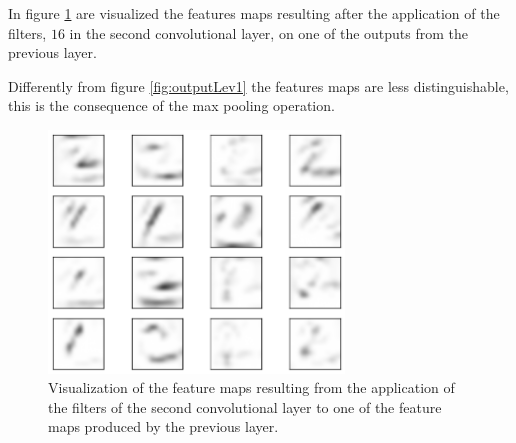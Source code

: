 In figure \ref{fig:outputLev2} are visualized the features maps resulting after the application of the filters, $16$ in the second convolutional layer, on one of the outputs from the previous layer.

Differently from figure \ref{fig:outputLev1} the features maps are less distinguishable, this is the consequence of the max pooling operation.

\begin{figure}
	\centering
	\includegraphics[width=0.7\textwidth]{Images/conv_outputLev2_digit2}
	\caption{Visualization of the feature maps resulting from the application of the filters of the second convolutional layer to one of the feature maps produced by the previous layer.}
	\label{fig:outputLev2}
\end{figure}

